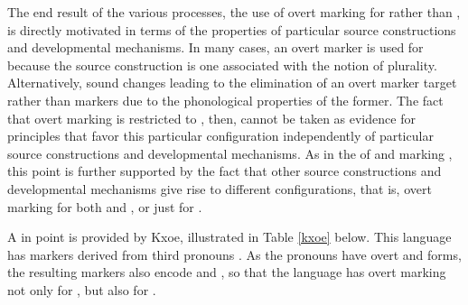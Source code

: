 \documentclass[output=paper]{langsci/langscibook}
\begin{document}
The end result of the various processes, the use of  overt marking for
 rather than , is directly motivated in
terms of the properties of particular source constructions and
developmental mechanisms.  In many cases,  an overt
marker is  used for  because the source construction is one associated with the notion of
plurality. Alternatively, sound changes leading to the elimination of
an overt marker target  rather than  markers due to the
phonological properties of the former. The fact that overt marking
is restricted to , then, cannot be taken as evidence for
principles that favor this particular configuration independently of
particular source constructions and developmental mechanisms. As in
the  of  and   marking , this point
is further supported by the fact that other source
constructions and developmental mechanisms give rise to different
configurations, that is, overt marking for both  and ,
or just for .

A  in point is provided by Kxoe,
illustrated in Table \ref{kxoe} below. This language has 
markers derived from third  pronouns \citep{Heine1982}. As the
pronouns have overt  and  forms, the resulting 
markers also encode  and , so that the language has
overt marking not only for , but also for .
\end{document}
